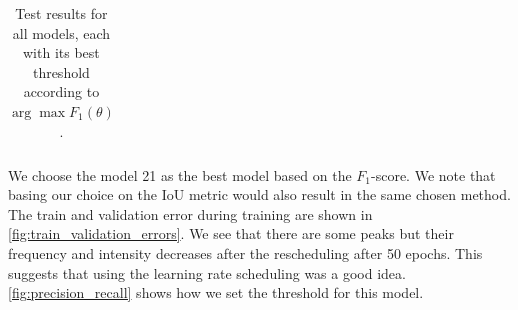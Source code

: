 \documentclass[10pt,conference]{IEEEtran}
\begin{document}
\begin{table}
    \begin{center}
        \begin{tabular}{||c | c c c c||}
             \hline
             
        \end{tabular}
    \end{center}
    \caption{Test results for all models, each with its best threshold according to $\arg\max F_1(\theta)$.
    }
    \label{tbl:test_results}
\end{table}

We choose the model 21 as the best model based on the $F_1$-score. We note that basing our choice on the IoU metric would also result in the same chosen method. The train and validation error during training are shown in \autoref{fig:train_validation_errors}. We see that there are some peaks but their frequency and intensity decreases after the rescheduling after 50 epochs. This suggests that using the learning rate scheduling was a good idea. \autoref{fig:precision_recall} shows how we set the threshold for this model.
\end{document}
